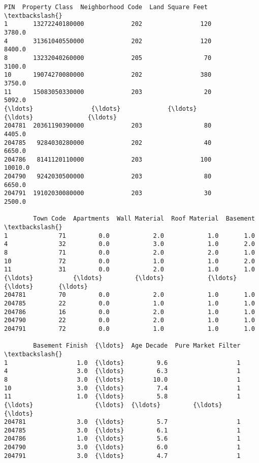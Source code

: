 \documentclass[11pt]{article}
\makeatletter
\newcommand{\boxspacing}{\kern\kvtcb@left@rule\kern\kvtcb@boxsep}
\newcommand{\prompt}[4]{
        {\ttfamily\llap{{\color{#2}[#3]:\hspace{3pt}#4}}\vspace{-\baselineskip}}
    }
\makeatother
\begin{document}
            \begin{tcolorbox}[breakable, size=fbox, boxrule=.5pt, pad at break*=1mm, opacityfill=0]
\prompt{Out}{outcolor}{34}{\boxspacing}
\begin{Verbatim}[commandchars=\\\{\}]
                   PIN  Property Class  Neighborhood Code  Land Square Feet  \textbackslash{}
1       13272240180000             202                120            3780.0
4       31361040550000             202                120            8400.0
8       13232040260000             205                 70            3100.0
10      19074270080000             202                380            3750.0
11      15083050330000             203                 20            5092.0
{\ldots}                {\ldots}             {\ldots}                {\ldots}               {\ldots}
204781  20361190390000             203                 80            4405.0
204785   9284030280000             202                 40            6650.0
204786   8141120110000             203                100           10010.0
204790   9242030500000             203                 80            6650.0
204791  19102030080000             203                 30            2500.0

        Town Code  Apartments  Wall Material  Roof Material  Basement  \textbackslash{}
1              71         0.0            2.0            1.0       1.0
4              32         0.0            3.0            1.0       2.0
8              71         0.0            2.0            2.0       1.0
10             72         0.0            1.0            1.0       2.0
11             31         0.0            2.0            1.0       1.0
{\ldots}           {\ldots}         {\ldots}            {\ldots}            {\ldots}       {\ldots}
204781         70         0.0            2.0            1.0       1.0
204785         22         0.0            1.0            1.0       1.0
204786         16         0.0            2.0            1.0       1.0
204790         22         0.0            2.0            1.0       1.0
204791         72         0.0            1.0            1.0       1.0

        Basement Finish  {\ldots}  Age Decade  Pure Market Filter  \textbackslash{}
1                   1.0  {\ldots}         9.6                   1
4                   3.0  {\ldots}         6.3                   1
8                   3.0  {\ldots}        10.0                   1
10                  3.0  {\ldots}         7.4                   1
11                  1.0  {\ldots}         5.8                   1
{\ldots}                 {\ldots}  {\ldots}         {\ldots}                 {\ldots}
204781              3.0  {\ldots}         5.7                   1
204785              3.0  {\ldots}         6.1                   1
204786              1.0  {\ldots}         5.6                   1
204790              3.0  {\ldots}         6.0                   1
204791              3.0  {\ldots}         4.7                   1


\end{Verbatim}
\end{tcolorbox}
\end{document}
